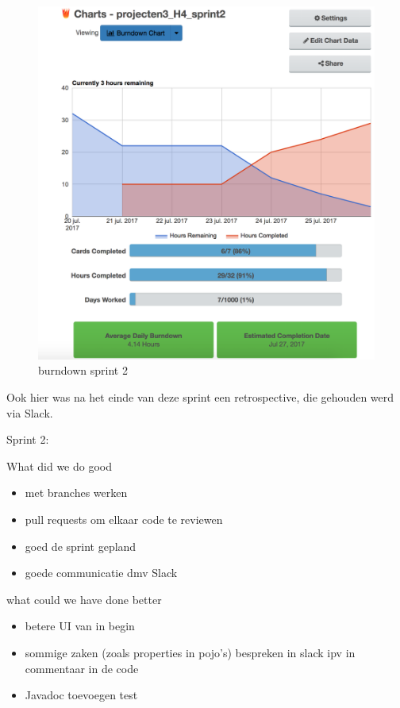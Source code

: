 \begin{figure}[H]
	\centering
\includegraphics[width=15cm]{img/burndown_week2.png}
\caption{burndown sprint 2}
\end{figure}

Ook hier was na het einde van deze sprint een retrospective, die gehouden werd via Slack.

Sprint 2:

What did we do good
\begin{itemize}
\item met branches werken
\item pull requests om elkaar code te reviewen
\item goed de sprint gepland
\item  goede communicatie dmv Slack
\end{itemize}

what could we have done better

\begin{itemize}
\item betere UI van in begin
\item sommige zaken (zoals properties in pojo's) bespreken in slack ipv in commentaar in de code
\item Javadoc toevoegen test
\end{itemize}


